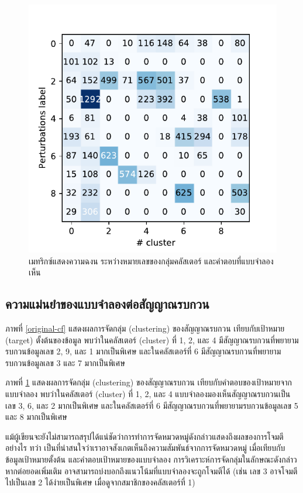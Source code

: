 \documentclass{cpepaper}
\begin{document}
\begin{figure}
    \centering
    \includegraphics[width=\columnwidth]{images/perturbs-cf.pdf}
    \caption{เมทริกซ์แสดงความฉงน ระหว่างหมายเลขของกลุ่มคลัสเตอร์ และคำตอบที่แบบจำลองเห็น}
    \label{perturbs-cf}
\end{figure}

\subsection{ความแม่นยำของแบบจำลองต่อสัญญาณรบกวน}

ภาพที่ \ref{original-cf} แสดงผลการจัดกลุ่ม (clustering) ของสัญญาณรบกวน เทียบกับเป้าหมาย (target) ตั้งต้นของข้อมูล พบว่าในคลัสเตอร์ (cluster) ที่ 1, 2, และ 4 มีสัญญาณรบกวนที่พยายามรบกวนข้อมูลเลข 2, 9, และ 1 มากเป็นพิเศษ และในคลัสเตอร์ที่ 6 มีสัญญาณรบกวนที่พยายามรบกวนข้อมูลเลข 3 และ 7 มากเป็นพิเศษ

ภาพที่ \ref{perturbs-cf} แสดงผลการจัดกลุ่ม (clustering) ของสัญญาณรบกวน เทียบกับคำตอบของเป้าหมายจากแบบจำลอง พบว่าในคลัสเตอร์ (cluster) ที่ 1, 2, และ 4 แบบจำลองมองเห็นสัญญาณรบกวนเป็นเลข 3, 6, และ 2 มากเป็นพิเศษ และในคลัสเตอร์ที่ 6 มีสัญญาณรบกวนที่พยายามรบกวนข้อมูลเลข 5 และ 8 มากเป็นพิเศษ

แม้ผู้เขียนจะยังไม่สามารถสรุปได้แน่ชัดว่าการทำการจัดหมวดหมู่ดังกล่าวแสดงถึงผลของการโจมตีอย่างไร ทว่า เป็นที่น่าสนใจว่าเราอาจสังเกตเห็นถึงความสัมพันธ์จากการจัดหมวดหมู่ เมื่อเทียบกับข้อมูลเป้าหมายตั้งต้น และคำตอบเป้าหมายของแบบจำลอง การวิเคราะห์การจัดกลุ่มในลักษณะดังกล่าว หากต่อยอดเพิ่มเติม อาจสามารถบ่งบอกถึงแนวโน้มที่แบบจำลองจะถูกโจมตีได้ (เช่น เลข 3 อาจโจมตีไปเป็นเลข 2 ได้ง่ายเป็นพิเศษ เมื่อดูจากสมาชิกของคลัสเตอร์ที่ 1)
\end{document}
